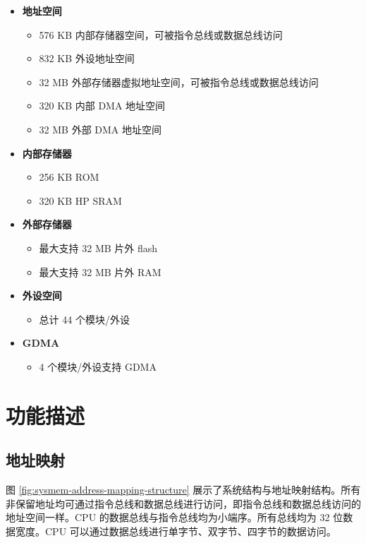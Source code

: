 \documentclass[main\_\_CN.tex]{subfiles}
\begin{document}
\begin{itemize}
    \item {\bfseries 地址空间}
        \begin{itemize}
    	    \item 576 KB 内部存储器空间，可被指令总线或数据总线访问
    	    \item 832 KB 外设地址空间
    	    \item 32 MB 外部存储器虚拟地址空间，可被指令总线或数据总线访问
    	    \item 320 KB 内部 DMA 地址空间
                \item 32 MB 外部 DMA 地址空间
        \end{itemize}
    \item {\bfseries 内部存储器}
        \begin{itemize}
            \item 256 KB ROM 
	    \item 320 KB HP SRAM
	    \end{itemize}
    \item {\bfseries 外部存储器}
        \begin{itemize}
            \item 最大支持 32 MB 片外 flash
            \item 最大支持 32 MB 片外 RAM
	    \end{itemize}
    \item \textbf{外设空间}
        \begin{itemize}
           \item 总计 44 个模块/外设
        \end{itemize}
    \item {\bfseries GDMA}
        \begin{itemize}
            \item 4 个模块/外设支持 GDMA
        \end{itemize}
\end{itemize}

\section{功能描述}

\subsection{地址映射}

图 \ref{fig:sysmem-address-mapping-structure} 展示了系统结构与地址映射结构。所有非保留地址均可通过指令总线和数据总线进行访问，即指令总线和数据总线访问的地址空间一样。CPU 的数据总线与指令总线均为小端序。所有总线均为 32 位数据宽度。CPU 可以通过数据总线进行单字节、双字节、四字节的数据访问。
\end{document}
